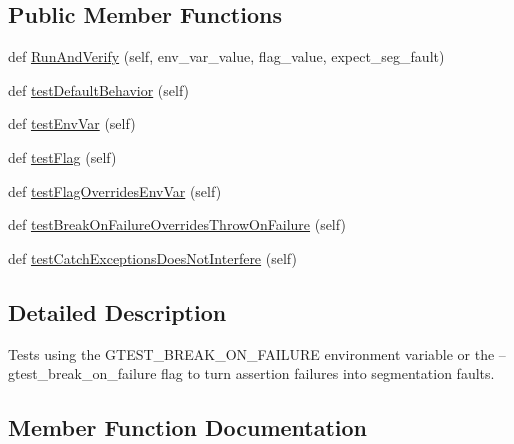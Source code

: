 \subsection*{Public Member Functions}
\begin{DoxyCompactItemize}
\item 
def \hyperlink{classgtest__break__on__failure__unittest_1_1_g_test_break_on_failure_unit_test_a0a66475873f545d88655b8bb14368f2e}{Run\+And\+Verify} (self, env\+\_\+var\+\_\+value, flag\+\_\+value, expect\+\_\+seg\+\_\+fault)
\item 
def \hyperlink{classgtest__break__on__failure__unittest_1_1_g_test_break_on_failure_unit_test_a8c21b7ecccc27268cb6c3d30b933b812}{test\+Default\+Behavior} (self)
\item 
def \hyperlink{classgtest__break__on__failure__unittest_1_1_g_test_break_on_failure_unit_test_a2beae948940a4fd898c8183c3bb221da}{test\+Env\+Var} (self)
\item 
def \hyperlink{classgtest__break__on__failure__unittest_1_1_g_test_break_on_failure_unit_test_af6018e5253c1107c5afaba3e2cb573fe}{test\+Flag} (self)
\item 
def \hyperlink{classgtest__break__on__failure__unittest_1_1_g_test_break_on_failure_unit_test_a15836ddb27e51e9aaf2f8aad84f5cef7}{test\+Flag\+Overrides\+Env\+Var} (self)
\item 
def \hyperlink{classgtest__break__on__failure__unittest_1_1_g_test_break_on_failure_unit_test_a3c5855e045236a309a5bff73ee6b503e}{test\+Break\+On\+Failure\+Overrides\+Throw\+On\+Failure} (self)
\item 
def \hyperlink{classgtest__break__on__failure__unittest_1_1_g_test_break_on_failure_unit_test_a70cc7732ac68ffe587657a3a5309aa4a}{test\+Catch\+Exceptions\+Does\+Not\+Interfere} (self)
\end{DoxyCompactItemize}


\subsection{Detailed Description}
\begin{DoxyVerb}Tests using the GTEST_BREAK_ON_FAILURE environment variable or
the --gtest_break_on_failure flag to turn assertion failures into
segmentation faults.
\end{DoxyVerb}
 

\subsection{Member Function Documentation}
\mbox{\label{classgtest__break__on__failure__unittest_1_1_g_test_break_on_failure_unit_test_a0a66475873f545d88655b8bb14368f2e}} 
